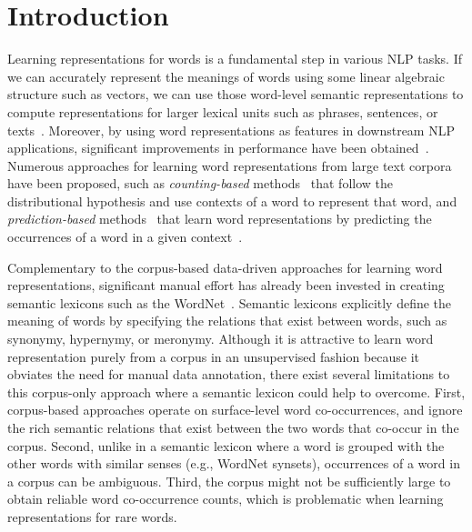 \documentclass[letterpaper]{article}
\begin{document}
\section{Introduction}
\label{sec:intro}

Learning representations for words is a fundamental step in various NLP tasks. If we can accurately represent the meanings of words
using some linear algebraic structure such as vectors, we can use those word-level semantic representations to compute
representations for larger lexical units such as phrases, sentences,
or texts~\cite{socher-EtAl:2012:EMNLP-CoNLL,Le:ICML:2014}.
Moreover, by using word representations as features in downstream NLP applications,
significant improvements in performance have been obtained~\cite{Turian:ACL:2010,Bollegala:ACL:2015,Collobert:2011}.
Numerous approaches for learning word representations from large text corpora have been proposed, such as
\emph{counting-based} methods~\cite{Turney:JAIR:2010} that follow the distributional hypothesis and use contexts
 of a word to represent that word, and \emph{prediction-based} methods~\cite{Mikolov:NIPS:2013}
 that learn word representations by predicting the occurrences
 of a word in a given context~\cite{baroni-dinu-kruszewski:2014:P14-1}.


Complementary to the corpus-based data-driven approaches for learning word representations, significant manual effort has
already been invested in creating semantic lexicons such as the WordNet~\cite{WordNet}.
Semantic lexicons explicitly define the meaning of words by
specifying the relations that exist between words, such as synonymy, hypernymy, or meronymy.
Although it is attractive to learn word representation purely from a corpus in an unsupervised fashion because it obviates the need
for manual data annotation, there exist several limitations to this corpus-only approach where a semantic lexicon could help to overcome.
First, corpus-based approaches operate on surface-level word co-occurrences, and ignore the rich semantic relations that exist
between the two words that co-occur in the corpus.
Second, unlike in a semantic lexicon where a word is grouped with the other words with similar senses (e.g., WordNet synsets),
occurrences of a word in a corpus can be ambiguous. Third, the corpus might not be sufficiently large to obtain reliable
word co-occurrence counts, which is problematic when learning representations for rare words.
\end{document}

